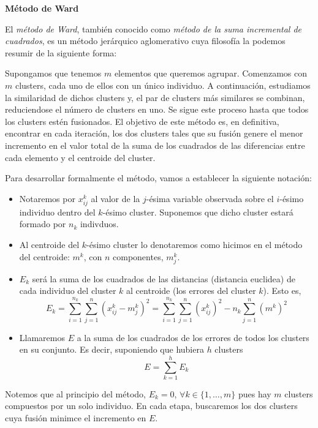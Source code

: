 \vspace{0.5cm}

\textbf{Método de Ward} \newline

El \textit{método de Ward}, también conocido como \textit{método de la suma incremental de cuadrados}, es un método jerárquico aglomerativo cuya filosofía la podemos resumir de la siguiente forma: \newline

Supongamos que tenemos $m$ elementos que queremos agrupar. Comenzamos con $m$ clusters, cada uno de ellos con un único individuo. A continuación, estudiamos la similaridad de dichos clusters y, el par de clusters más
similares se combinan, reduciendose el número de clusters en uno. Se sigue este proceso hasta que todos los clusters estén fusionados. El objetivo de este método es, en definitiva, encontrar en cada iteración, los dos 
clusters tales que su fusión genere el menor incremento en el valor total de la suma de los cuadrados de las diferencias entre cada elemento y el centroide del cluster. \newline

Para desarrollar formalmente el método, vamos a establecer la siguiente notación:

\begin{itemize}
    \item Notaremos por $x^{k}_{ij}$ al valor de la $j$-ésima variable observada sobre el $i$-ésimo individuo dentro del $k$-ésimo cluster. Suponemos que dicho cluster estará formado por $n_{k}$ indivduos.
    \item Al centroide del $k$-ésimo cluster lo denotaremos como hicimos en el método del centroide: $m^{k}$, con $n$ componentes, $m^{k}_{j}$.
    \item $E_{k}$ será la suma de los cuadrados de las distancias (distancia euclidea) de cada individuo del cluster $k$ al centroide (los errores del cluster $k$). Esto es,
    \[
    E_{k} = \sum_{i=1}^{n_{k}}\sum_{j=1}^{n}(x^{k}_{ij} - m^{k}_{j})^{2} = \sum_{i=1}^{n_{k}}\sum_{j=1}^{n}(x^{k}_{ij})^{2} - n_{k}\sum_{j=1}^{n}(m^{k})^{2}
    \]
    \item Llamaremos $E$ a la suma de los cuadrados de los errores de todos los clusters en su conjunto. Es decir, suponiendo que hubiera $h$ clusters
    \[
    E = \sum_{k=1}^{h} E_{k}
    \]
\end{itemize}


\begin{observacion}
    Notemos que al principio del método, $E_{k} = 0$, $\forall k \in \{1,\dots,m\}$ pues hay $m$ clusters compuestos por un solo individuo. \newline
    En cada etapa, buscaremos los dos clusters cuya fusión minimce el incremento en $E$.
\end{observacion}

